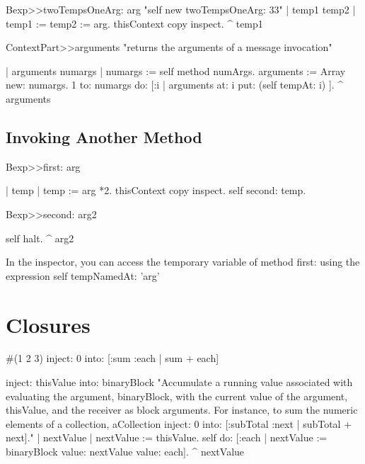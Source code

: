 \documentclass[a4paper,10pt,twoside]{book}
\begin{document}
\begin{code}{}
Bexp>>twoTempsOneArg: arg
	"self new twoTempsOneArg: 33"
	| temp1 temp2 |
	temp1 := temp2 := arg.
	thisContext copy inspect.
	^ temp1
\end{code}


\begin{code}{}
ContextPart>>arguments
	"returns the arguments of a message invocation"

	| arguments numargs |
	numargs :=  self method numArgs.
	arguments := Array new: numargs.
	1 to: numargs do: [:i | arguments at: i put: (self tempAt: i) ].
	^ arguments
\end{code}


\subsection{Invoking Another Method}
\begin{code}{}
Bexp>>first: arg

	| temp |
	temp := arg *2.
	thisContext copy inspect.
	self second: temp.

Bexp>>second: arg2

	self halt.
	^ arg2
\end{code}

In the inspector, you can access the temporary variable of method first: using the expression self tempNamedAt: 'arg'




\section{Closures}
\begin{code}{}
#(1 2 3) inject: 0 into: [:sum :each | sum + each]
\end{code}

\begin{code}{}
inject: thisValue into: binaryBlock
	"Accumulate a running value associated with evaluating the argument,
	binaryBlock, with the current value of the argument, thisValue, and the
	receiver as block arguments. For instance, to sum the numeric elements of a
	collection, aCollection inject: 0 into: [:subTotal :next | subTotal + next]."
	| nextValue |
	nextValue := thisValue.
	self do: [:each | nextValue := binaryBlock value: nextValue value: each]. 	^ nextValue
\end{code}
\end{document}
